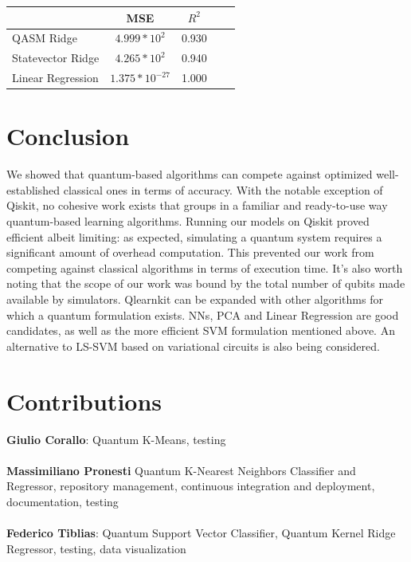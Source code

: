 \documentclass{article}
\begin{document}
\begin{multicols}{2}
\columnbreak

\begin{center}
\begin{tabular}{lcccl}
\toprule
       & MSE    & $R^2$ \\
\midrule
 QASM Ridge & $4.999*10^{2}$ & 0.930    \\
  Statevector Ridge & $4.265*10^{2}$ & 0.940    \\
 Linear Regression & $1.375*10^{-27}$ & 1.000 \\
\bottomrule
\end{tabular}
\end{center}


\section{Conclusion}
We showed that quantum-based algorithms can compete against optimized well-established classical ones in terms of accuracy. With the notable exception of Qiskit, no cohesive work exists that groups in a familiar and ready-to-use way quantum-based learning algorithms. Running our models on Qiskit proved efficient albeit limiting: as expected, simulating a quantum system requires a significant amount of overhead computation. This prevented our work from competing against classical algorithms in terms of execution time. It’s also worth noting that the scope of our work was bound by the total number of qubits made available by simulators. Qlearnkit can be expanded with other algorithms for which a quantum formulation exists. NNs, PCA and Linear Regression are good candidates, as well as the more efficient SVM formulation mentioned above. An alternative to LS-SVM based on variational circuits is also being considered. 


\section{Contributions}
\textbf{Giulio Corallo}: Quantum K-Means, testing \\\\
\textbf{Massimiliano Pronesti} Quantum K-Nearest Neighbors Classifier and Regressor, repository management, continuous integration and deployment, documentation, testing \\\\
\textbf{Federico Tiblias}: Quantum Support Vector Classifier, Quantum Kernel Ridge Regressor, testing, data visualization\\\\

\end{multicols}
\newpage
\printbibliography
\end{document}
